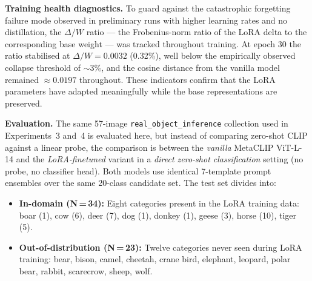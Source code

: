 \noindent \textbf{Training health diagnostics.} To guard against the catastrophic forgetting failure mode observed in preliminary runs with higher learning rates and no distillation, the $\Delta/W$ ratio --- the Frobenius-norm ratio of the LoRA delta to the corresponding base weight --- was tracked throughout training. At epoch 30 the ratio stabilised at $\Delta/W = 0.0032$ (0.32\%), well below the empirically observed collapse threshold of ${\sim}3\%$, and the cosine distance from the vanilla model remained ${\approx}0.0197$ throughout. These indicators confirm that the LoRA parameters have adapted meaningfully while the base representations are preserved.

\noindent \textbf{Evaluation.} The same 57-image \texttt{real\_object\_inference} collection used in Experiments~3 and~4 is evaluated here, but instead of comparing zero-shot CLIP against a linear probe, the comparison is between the \emph{vanilla} MetaCLIP ViT-L-14 and the \emph{LoRA-finetuned} variant in a \emph{direct zero-shot classification} setting (no probe, no classifier head). Both models use identical 7-template prompt ensembles over the same 20-class candidate set. The test set divides into:
\begin{itemize}
    \item \textbf{In-domain (N\,=\,34):} Eight categories present in the LoRA training data: boar (1), cow (6), deer (7), dog (1), donkey (1), geese (3), horse (10), tiger (5).
    \item \textbf{Out-of-distribution (N\,=\,23):} Twelve categories never seen during LoRA training: bear, bison, camel, cheetah, crane bird, elephant, leopard, polar bear, rabbit, scarecrow, sheep, wolf.
\end{itemize}

\begin{table}[htbp]
\centering
\caption{Experiment~5: Vanilla vs LoRA-finetuned MetaCLIP ViT-L-14 on 57 real animal photographs. LoRA adapts only the first 12 image-encoder blocks (rank\,=\,16; 0.73\% of parameters); the text encoder and all remaining visual parameters are frozen. In-domain: 8 categories present in the \texttt{final\_v9} training set. OOD: 12 categories never seen during LoRA training. $\uparrow$ = improvement, $\downarrow$ = degradation, $=$ = no change.}
\label{tab:exp5_lora}
\renewcommand{\arraystretch}{1.3}
\end{table}

